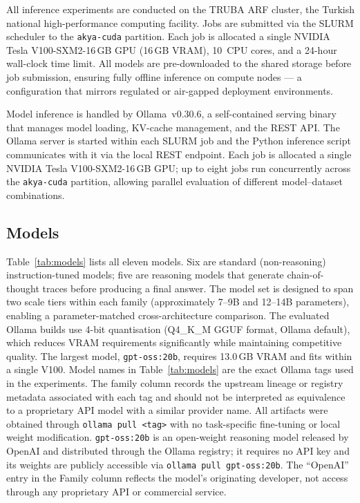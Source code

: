 \documentclass[journal]{IEEEtran}
\begin{document}
All inference experiments are conducted on the TRUBA ARF cluster,
the Turkish national high-performance computing facility. Jobs are
submitted via the SLURM scheduler to the \texttt{akya-cuda} partition.
Each job is allocated a single NVIDIA Tesla V100-SXM2-16\,GB GPU
(16\,GB VRAM), 10~CPU cores, and a 24-hour wall-clock time limit.
All models are pre-downloaded to the shared storage before job submission,
ensuring fully offline inference on compute nodes — a configuration
that mirrors regulated or air-gapped deployment environments.

Model inference is handled by Ollama~v0.30.6, a self-contained
serving binary that manages model loading, KV-cache management,
and the REST API. The Ollama server is started within each SLURM
job and the Python inference script communicates with it via
the local REST endpoint. Each job is allocated a single NVIDIA
Tesla V100-SXM2-16\,GB GPU; up to eight jobs run concurrently
across the \texttt{akya-cuda} partition, allowing parallel
evaluation of different model--dataset combinations.

\subsection{Models}

Table~\ref{tab:models} lists all eleven models. Six are standard
(non-reasoning) instruction-tuned models; five are reasoning models
that generate chain-of-thought traces before producing a final answer.
The model set is designed to span two scale tiers within each family
(approximately 7--9B and 12--14B parameters), enabling a parameter-matched
cross-architecture comparison. The evaluated Ollama builds use 4-bit
quantisation (Q4\_K\_M GGUF format, Ollama default), which reduces
VRAM requirements significantly while maintaining competitive quality.
The largest model, \texttt{gpt-oss:20b}, requires 13.0\,GB VRAM and
fits within a single V100.
Model names in Table~\ref{tab:models} are the exact Ollama tags used
in the experiments. The family column records the upstream lineage or
registry metadata associated with each tag and should not be interpreted
as equivalence to a proprietary API model with a similar provider name.
All artifacts were obtained through \texttt{ollama pull <tag>} with no
task-specific fine-tuning or local weight modification.
\texttt{gpt-oss:20b} is an open-weight reasoning model released by
OpenAI and distributed through the Ollama registry; it requires no API
key and its weights are publicly accessible via
\texttt{ollama pull gpt-oss:20b}.
The ``OpenAI'' entry in the Family column reflects the model's
originating developer, not access through any proprietary API or
commercial service.
\end{document}
